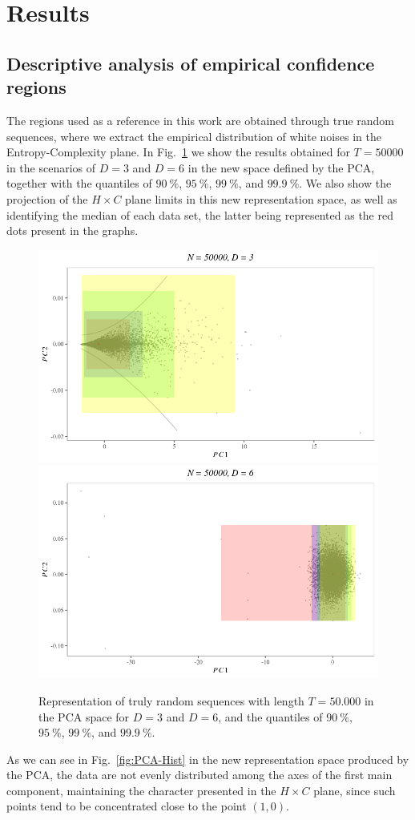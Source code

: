 \section{Results}\label{Sec:Results}

\subsection{Descriptive analysis of empirical confidence regions}

The regions used as a reference in this work are obtained through true random sequences, where we extract the empirical distribution of white noises in the Entropy-Complexity plane.
In Fig.~\ref{fig:HC-PCA} we show the results obtained for $T = 50000$ in the scenarios of $D = 3$ and $D = 6$ in the new space defined by the PCA, together with the quantiles of $\SI{90}{\percent}$, $\SI{95}{\percent}$, $\SI{99}{\percent}$, and $\SI{99.9}{\percent}$.
We also show the projection of the $H \times C$ plane limits in this new representation space, as well as identifying the median of each data set, the latter being represented as the red dots present in the graphs.

\begin{figure}
	\centering
	\includegraphics[width=.45\linewidth]{Figures/HC-PCA-Trozos-D3N50k.png}
	\includegraphics[width=.45\linewidth]{Figures/HC-PCA-Trozos-D6N50k.png}
	\caption{Representation of truly random sequences with length $T = 50.000$ in the PCA space for $D = 3$ and $D = 6$, and the quantiles of $\SI{90}{\percent}$, $\SI{95}{\percent}$, $\SI{99}{\percent}$, and $\SI{99.9}{\percent}$.}
	\label{fig:HC-PCA}
\end{figure} 

As we can see in Fig.~\ref{fig:PCA-Hist} in the new representation space produced by the PCA, the data are not evenly distributed among the axes of the first main component, maintaining the character presented in the $H \times C$ plane, since such points tend to be concentrated close to the point $(1, 0)$.

